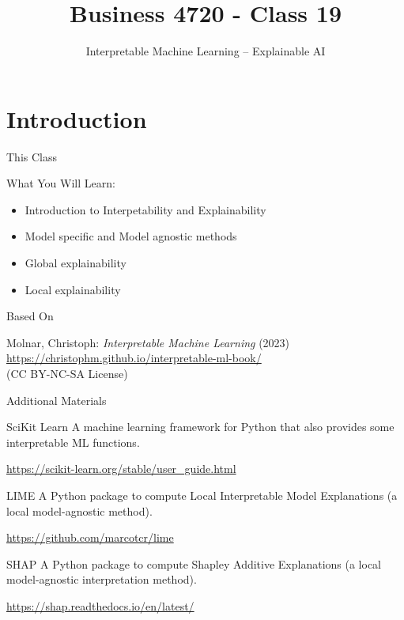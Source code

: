 \documentclass[ignorenonframetext,xcolor=x11names]{beamer}
\title{Business 4720 - Class 19}
\subtitle{Interpretable Machine Learning -- Explainable AI}
\begin{document}
\begin{frame}{}
  \titlepage
  \footnotesize
  
\end{frame}

\section{Introduction}

\begin{frame}{This Class}

\begin{block}{What You Will Learn:}
\begin{itemize}
  \item Introduction to Interpetability and Explainability
  \item Model specific and Model agnostic methods
  \item Global explainability
  \item Local explainability
\end{itemize}
\end{block}
\end{frame}

\begin{frame}{Based On}
\begin{block}{}
Molnar, Christoph: \emph{Interpretable Machine Learning} (2023) \\

\vspace{\baselineskip}
\small
\url{https://christophm.github.io/interpretable-ml-book/} \\

\vspace{\baselineskip}
(CC BY-NC-SA License)
\end{block}

\end{frame}

\begin{frame}{Additional Materials}
\small
\begin{block}{SciKit Learn}
A machine learning framework for Python that also provides some interpretable ML functions.

\url{https://scikit-learn.org/stable/user_guide.html}
\end{block}

\begin{block}{LIME}
A Python package to compute Local Interpretable Model Explanations (a local model-agnostic method).

\url{https://github.com/marcotcr/lime}
\end{block}
\begin{block}{SHAP}
A Python package to compute Shapley Additive Explanations (a local model-agnostic interpretation method).

\url{https://shap.readthedocs.io/en/latest/}
\end{block}
\end{frame}
\end{document}
